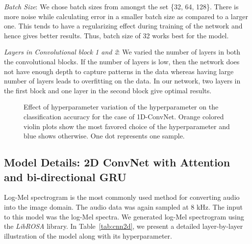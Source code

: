 \documentclass[runningheads]{llncs}
\begin{document}
\emph{Batch Size}: We chose batch sizes from amongst the set \{32, 64, 128\}. There is more noise while calculating error in a smaller batch size as compared to a larger one. This tends to have a regularizing effect during training of the network and hence gives better results. Thus, batch size of 32 works best for the model.

\emph{Layers in Convolutional block 1 and 2}: We varied the number of layers in both the convolutional blocks. If the number of layers is low, then the network does not have enough depth to capture patterns in the data whereas having large number of layers leads to overfitting on the data. In our network, two layers in the first block and one layer in the second block give optimal results.

\begin{figure}[t]
 \centering
 \setlength{\belowcaptionskip}{-20pt}
 \caption {Effect of hyperparameter variation of the hyperparameter on the  classification accuracy for the case of 1D-ConvNet. Orange colored violin plots show the most favored choice of the hyperparameter and blue shows otherwise. One dot represents one sample.}
 \label{fig:1dcnn}
\end{figure}

\subsection{Model Details: 2D ConvNet with Attention and bi-directional GRU}
\label{sec:2dgru}
Log-Mel spectrogram is the most commonly used method for converting audio into the image domain. The audio data was again sampled at 8 kHz. The input to this model was the log-Mel spectra. We generated log-Mel spectrogram using the \emph{LibROSA} \cite{Librosa} library. In Table~\ref{tab:cnn2d}, we present a detailed layer-by-layer illustration of the model along with its hyperparameter.
\end{document}
